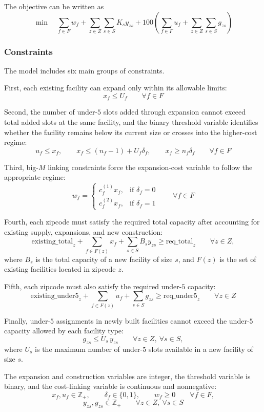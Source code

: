 \documentclass[11pt]{article}
\newcommand{\1}{\mathbb{I}}
\begin{document}
\noindent
The objective can be written as
\[
\min \quad
\sum_{f \in F} w_f
+
\sum_{z \in Z} \sum_{s \in S} K_s y_{zs}
+
100\left(\sum_{f \in F} u_f + \sum_{z \in Z} \sum_{s \in S} g_{zs}\right)
\]

\subsubsection{Constraints}

The model includes six main groups of constraints.

First, each existing facility can expand only within its allowable limits:
\[
x_f \le U_f
\qquad \forall f \in F
\]

Second, the number of under-\(5\) slots added through expansion cannot exceed total added slots at the same facility, and the binary threshold variable identifies whether the facility remains below its current size or crosses into the higher-cost regime:
\[
u_f \le x_f,\qquad
x_f \le (n_f-1) + U_f \delta_f,\qquad
x_f \ge n_f \delta_f
\qquad \forall f \in F
\]

Third, big-\(M\) linking constraints force the expansion-cost variable to follow the appropriate regime:
\[
w_f =
\begin{cases}
c_f^{(1)}x_f, & \text{if } \delta_f = 0\\
c_f^{(2)}x_f, & \text{if } \delta_f = 1
\end{cases}
\qquad \forall f \in F
\]

Fourth, each zipcode must satisfy the required total capacity after accounting for existing supply, expansions, and new construction:
\[
\mathrm{existing\_total}_z
+
\sum_{f \in F(z)} x_f
+
\sum_{s \in S} B_s y_{zs}
\ge
\mathrm{req\_total}_z
\qquad \forall z \in Z,
\]
where \(B_s\) is the total capacity of a new facility of size \(s\), and \(F(z)\) is the set of existing facilities located in zipcode \(z\).

Fifth, each zipcode must also satisfy the required under-\(5\) capacity:
\[
\mathrm{existing\_under5}_z
+
\sum_{f \in F(z)} u_f
+
\sum_{s \in S} g_{zs}
\ge
\mathrm{req\_under5}_z
\qquad \forall z \in Z
\]

Finally, under-\(5\) assignments in newly built facilities cannot exceed the under-\(5\) capacity allowed by each facility type:
\[
g_{zs} \le U_s\, y_{zs}
\qquad \forall z \in Z,\ \forall s \in S,
\]
where \(U_s\) is the maximum number of under-\(5\) slots available in a new facility of size \(s\).

The expansion and construction variables are integer, the threshold variable is binary, and the cost-linking variable is continuous and nonnegative:
\[
x_f, u_f \in \mathbb{Z}_+,\qquad \delta_f \in \{0,1\},\qquad w_f \ge 0
\qquad \forall f \in F,
\]
\[
y_{zs}, g_{zs} \in \mathbb{Z}_+
\qquad \forall z \in Z,\ \forall s \in S
\]
\end{document}
